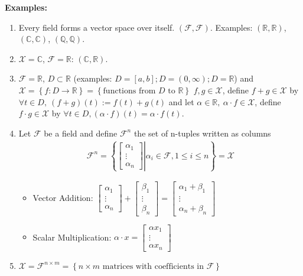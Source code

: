 \documentclass[letterpaper]{article}
\newcommand{\real}{\mathbb R}  %
\newcommand{\cp}{\mathbb C}    %
\begin{document}
\noindent \textbf{Examples:}
    \begin{enumerate}
        \item Every field forms a vector space over itself. $\left(\mathcal{F},\mathcal{F}\right)$. Examples: $\left(\real,\real\right)$, $\left(\cp,\cp\right)$, $\left(\mathbb{Q},\mathbb{Q}\right)$.
        \item $\mathcal{X} = \cp$, $\mathcal{F} = \real$: $\left(\cp,\real\right)$.
        \item $\mathcal{F} = \real$, $D \subset \real$ (examples: $D = \left[a,b\right]; D = \left(0,\infty\right); D = \real$) and $\mathcal{X} = \left\{f:D\to\real\right\} = \left\{\mbox{functions from } D \mbox{ to } \real \right\}$
        \newline
        $f,g\in\mathcal{X}$, define $f+g \in \mathcal{X}$ by $\forall t\in D,\ \left(f+g\right)(t) := f(t) + g(t)$ and let $\alpha\in\real,\ \alpha\cdot f\in\mathcal{X}$, define $f\cdot g\in\mathcal{X}$ by $\forall t\in D, \left(\alpha\cdot f\right)(t) = \alpha\cdot f(t)$.
        \item Let $\mathcal{F}$ be a field and define $\mathcal{F}^n$ the set of n-tuples written as columns
        \begin{align*}
            \mathcal{F}^n = \left\{\left.\begin{bmatrix} \alpha_1 \\ \vdots \\ \alpha_n \end{bmatrix} \right| \alpha_i \in \mathcal{F}, 1 \leq i \leq n\right\}=\mathcal{X}
        \end{align*}
        \begin{itemize}
            \item[] Vector Addition: $\begin{bmatrix} \alpha_1 \\ \vdots \\ \alpha_n \end{bmatrix} + \begin{bmatrix} \beta_1 \\ \vdots \\ \beta_n \end{bmatrix} = \begin{bmatrix} \alpha_1 + \beta_1 \\ \vdots \\ \alpha_n + \beta_n \end{bmatrix}$
            \item[] Scalar Multiplication: $\alpha\cdot x = \begin{bmatrix} \alpha x_1 \\ \vdots \\ \alpha x_n \end{bmatrix}$
        \end{itemize}
        \item $\mathcal{X} = \mathcal{F}^{n\times m} = \left\{n\times m \mbox{ matrices with coefficients in } \mathcal{F}\right\}$
    \end{enumerate}
\end{document}
